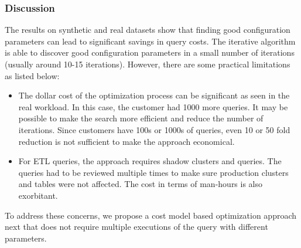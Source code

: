\subsubsection*{Discussion}
The results on synthetic and real datasets show that finding good configuration parameters can lead to significant savings in query costs. The iterative algorithm is able to discover good configuration parameters in a small number of iterations (usually around 10-15 iterations). However, there are some practical limitations as listed below:
\begin{itemize}
	\item The dollar cost of the optimization process can be significant as seen in the real workload. In this case, the customer had 1000 more queries. It may be possible to make the search more efficient and reduce the number of iterations. Since  customers have 100s or 1000s of queries, even 10 or 50 fold reduction is not sufficient to make the approach economical.
	\item For ETL queries, the approach requires shadow clusters and queries. The queries had to be reviewed multiple times to make sure production clusters and tables were not affected. The cost in terms of man-hours is also exorbitant. 	
\end{itemize} 
To address these concerns, we propose a cost model based optimization approach next that does not require multiple executions of the query with different parameters.
